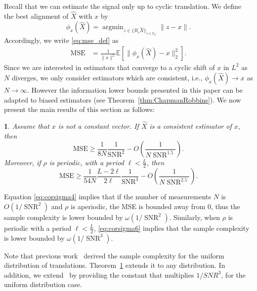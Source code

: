 \documentclass{IEEEtran}
\numberwithin{equation}{section}
\numberwithin{figure}{section}
\theoremstyle{plain}
\newtheorem{thm}{\protect\theoremname}[section]
\theoremstyle{definition}
\theoremstyle{remark}
\theoremstyle{plain}
\theoremstyle{remark}
\theoremstyle{plain}
\theoremstyle{plain}
\theoremstyle{remark}
\providecommand{\theoremname}{Theorem}
\newcommand{\E}{\mathbb{E}}
\newcommand{\SNR}{\operatorname{SNR}}
\DeclareMathOperator*{\argmin}{argmin}
\newcommand{\Z}{{\mathbb{Z}}}
\newcommand{\MSE}{\mathrm{MSE}}
\newcommand{\OO}{{O}}
\begin{document}
Recall that we can estimate the signal only up to cyclic translation. 
We define the best alignment of $\widehat X$ with $x$ by
%
\begin{equation}\label{eq:Rxdef}
%
\phi_{x}(\widehat{X}) = \argmin_{z\in \{ R_s\widehat{X}\}_{s\in\Z_L}} \|z-x\| .
%
\end{equation}
Accordingly, we write \eqref{eq:mse_def} as
\begin{align}
\textrm{MSE}&=\frac{1}{\|x\|^2}\E\left[\|\phi_{x}(\widehat X)-x\|^2_2\right]. \label{eq:MSE+Rx}
\end{align}
Since we are interested in estimators that converge to a cyclic shift of $x$ in $L^2$ as $N$ diverges, we only consider estimators which are consistent, i.e., $\phi_{x}(\widehat X)\rightarrow x$ as $N \to \infty$. However the information lower bounds presented in this paper can be adapted to biased estimators (see Theorem~\ref{thm:ChapmanRobbins}). We now present the main results of this section as follows:
\begin{thm}\label{thm:corsigma} 
	Assume that $x$ is not a constant vector. 
	If $\widehat X$ is a consistent estimator of $x$, then
	\begin{equation}\label{eq:corsigma4}
	\MSE \ge \frac{1}{8N}\frac1{\SNR^2}-\OO\left(\frac1{N\SNR^{1.5}}\right).
	\end{equation}
	Moreover, if $\rho$ is periodic, with a period $\ell<\frac L2$, then
	\begin{equation}\label{eq:corsigma6}
	\MSE \ge \frac{1}{54N}\frac{L-2\ell}{2\ell}\frac1{\SNR^3}-\OO\left(\frac1{N\SNR^{2.5}}\right).
	\end{equation}
		
\end{thm}

Equation \eqref{eq:corsigma4} implies that if the number of measurements $N$ is $\OO(1/\SNR^2)$ and $\rho$ is aperiodic, the MSE is bounded away from $0$, thus the sample complexity is lower bounded by $\omega(1/\SNR^2)$. Similarly, when $\rho$ is periodic with a period $\ell<\frac L2$, \eqref{eq:corsigma6} implies that the sample complexity is lower bounded by $\omega(1/\SNR^3)$. 

Note that previous work~\cite{bandeira2017optimal} derived the sample complexity for the uniform distribution of translations. Theorem~\ref{thm:corsigma} extends it to any distribution. In addition, we extend~\cite{bandeira2017optimal} by providing the constant that multiplies $1/SNR^3$, for the uniform distribution case.
\end{document}
